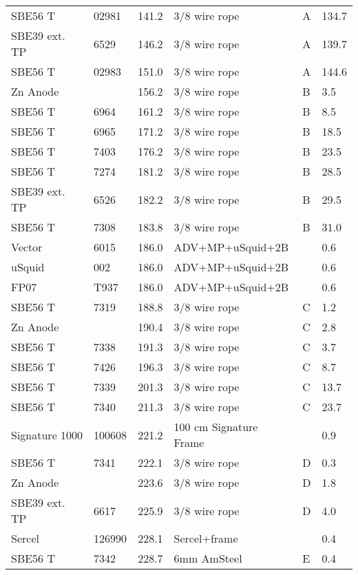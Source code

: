 \documentclass{article}
\begin{document}
\begin{table}[!htbp]
\begin{tabular}{llllll}
SBE56 T & 02981 & 141.2 & 3/8 wire rope & A & 134.7 \\
SBE39 ext. TP & 6529 & 146.2 & 3/8 wire rope & A & 139.7 \\
SBE56 T & 02983 & 151.0 & 3/8 wire rope & A & 144.6 \\
Zn Anode &  & 156.2 & 3/8 wire rope & B & 3.5 \\
SBE56 T & 6964 & 161.2 & 3/8 wire rope & B & 8.5 \\
SBE56 T & 6965 & 171.2 & 3/8 wire rope & B & 18.5 \\
SBE56 T & 7403 & 176.2 & 3/8 wire rope & B & 23.5 \\
SBE56 T & 7274 & 181.2 & 3/8 wire rope & B & 28.5 \\
SBE39 ext. TP & 6526 & 182.2 & 3/8 wire rope & B & 29.5 \\
SBE56 T & 7308 & 183.8 & 3/8 wire rope & B & 31.0 \\
Vector & 6015 & 186.0 & ADV+MP+uSquid+2B &  & 0.6 \\
uSquid & 002 & 186.0 & ADV+MP+uSquid+2B &  & 0.6 \\
FP07 & T937 & 186.0 & ADV+MP+uSquid+2B &  & 0.6 \\
SBE56 T & 7319 & 188.8 & 3/8 wire rope & C & 1.2 \\
Zn Anode &  & 190.4 & 3/8 wire rope & C & 2.8 \\
SBE56 T & 7338 & 191.3 & 3/8 wire rope & C & 3.7 \\
SBE56 T & 7426 & 196.3 & 3/8 wire rope & C & 8.7 \\
SBE56 T & 7339 & 201.3 & 3/8 wire rope & C & 13.7 \\
SBE56 T & 7340 & 211.3 & 3/8 wire rope & C & 23.7 \\
Signature 1000 & 100608 & 221.2 & 100 cm Signature Frame &  & 0.9 \\
SBE56 T & 7341 & 222.1 & 3/8 wire rope & D & 0.3 \\
Zn Anode &  & 223.6 & 3/8 wire rope & D & 1.8 \\
SBE39 ext. TP & 6617 & 225.9 & 3/8 wire rope & D & 4.0 \\
Sercel & 126990 & 228.1 & Sercel+frame &  & 0.4 \\
SBE56 T & 7342 & 228.7 & 6mm AmSteel & E & 0.4 \\
\bottomrule
\end{tabular}
\end{table}
\end{document}
